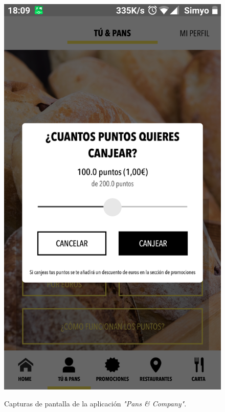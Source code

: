 \documentclass[twoside]{report}
\begin{document}
\begin{figure}[H]
\begin{center}
\includegraphics[scale=0.10]{images/restaurantes/pans2.png}
\caption{Capturas de pantalla de la aplicación \textit{"Pans \& Company"}.} \cite{pansapp}
\end{center}
\end{figure}
\end{document}
